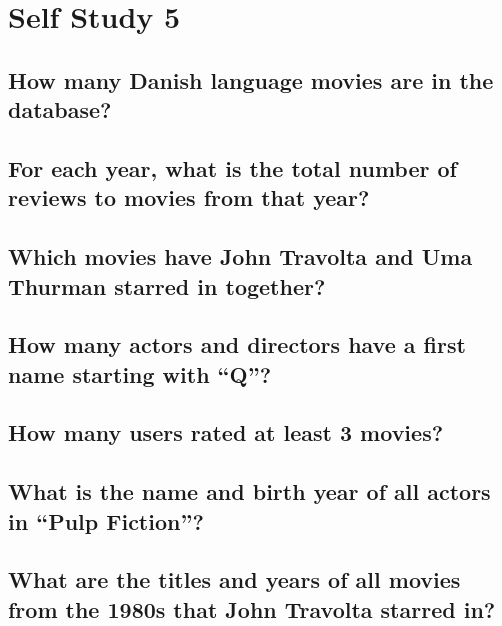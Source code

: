 \documentclass[a4paper,11pt]{memoir}
\begin{document}
\pagestyle{plain}
\chapter{Self Study 5}

\section{How many Danish language movies are in the database?}



\section{For each year, what is the total number of reviews to movies from that year?}



\section{Which movies have John Travolta and Uma Thurman starred in together?}



\section{How many actors and directors have a first name starting with ``Q''?}



\section{How many users rated at least 3 movies?}



\section{What is the name and birth year of all actors in ``Pulp Fiction''?}



\section{What are the titles and years of all movies from the 1980s that John Travolta starred in?}


\end{document}
